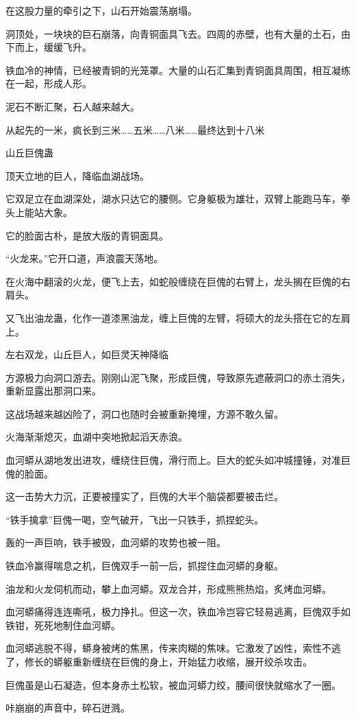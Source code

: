 \begin{this_body}
在这股力量的牵引之下，山石开始震荡崩塌。

洞顶处，一块块的巨石崩落，向青铜面具飞去。四周的赤壁，也有大量的土石，由下而上，缓缓飞升。

铁血冷的神情，已经被青铜的光笼罩。大量的山石汇集到青铜面具周围，相互凝练在一起，形成人形。

泥石不断汇聚，石人越来越大。

从起先的一米，疯长到三米……五米……八米……最终达到十八米

山丘巨傀蛊

顶天立地的巨人，降临血湖战场。

它双足立在血湖深处，湖水只达它的腰侧。它身躯极为雄壮，双臂上能跑马车，拳头上能站大象。

它的脸面古朴，是放大版的青铜面具。

“火龙来。”它开口道，声浪震天荡地。

在火海中翻滚的火龙，便飞上去，如蛇般缠绕在巨傀的右臂上，龙头搁在巨傀的右肩头。

又飞出油龙蛊，化作一道漆黑油龙，缠上巨傀的左臂，将硕大的龙头搭在它的左肩上。

左右双龙，山丘巨人，如巨灵天神降临

方源极力向洞口游去。刚刚山泥飞聚，形成巨傀，导致原先遮蔽洞口的赤土消失，重新显露出那洞口来。

这战场越来越凶险了，洞口也随时会被重新掩埋，方源不敢久留。

火海渐渐熄灭，血湖中突地掀起滔天赤浪。

血河蟒从湖地发出进攻，缠绕住巨傀，滑行而上。巨大的蛇头如冲城撞锤，对准巨傀的脸面。

这一击势大力沉，正要被撞实了，巨傀的大半个脑袋都要被击烂。

“铁手擒拿”巨傀一喝，空气破开，飞出一只铁手，抓捏蛇头。

轰的一声巨响，铁手被毁，血河蟒的攻势也被一阻。

铁血冷赢得喘息之机，巨傀双手一前一后，抓捏住血河蟒的身躯。

油龙和火龙伺机而动，攀上血河蟒。双龙合并，形成熊熊热焰，炙烤血河蟒。

血河蟒痛得连连嘶吼，极力挣扎。但这一次，铁血冷岂容它轻易逃离，巨傀双手如铁钳，死死地制住血河蟒。

血河蟒逃脱不得，蟒身被烤的焦黑，传来肉糊的焦味。它激发了凶性，索性不逃了，修长的蟒躯重新缠绕在巨傀的身上，开始猛力收缩，展开绞杀攻击。

巨傀虽是山石凝造，但本身赤土松软，被血河蟒力绞，腰间很快就缩水了一圈。

咔崩崩的声音中，碎石迸溅。


\end{this_body}
